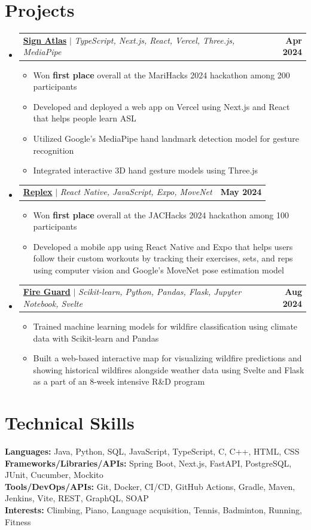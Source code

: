 \documentclass[letterpaper,11pt]{article}
\makeatletter
\newcommand{\resumeItem}[1]{
  \item\small{
    {#1 \vspace{-2pt}}
  }
}
\newcommand{\resumeProjectHeading}[4]{
  \item
  \begin{tabular*}{\textwidth}{l@{\extracolsep{\fill}}r}
    \small{\href{#3}{\textbf{#1}\hspace{0.3em}{\faLink}} $|$ \emph{#2}} & \textbf{\small #4} \\
  \end{tabular*}\vspace{-7pt}
}
\newcommand{\resumeSubHeadingListStart}{\begin{itemize}[leftmargin=0in, label={}]}
\newcommand{\resumeSubHeadingListEnd}{\end{itemize}}
\newcommand{\resumeItemListStart}{\begin{itemize}}
\newcommand{\resumeItemListEnd}{\end{itemize}\vspace{-5pt}}
\makeatother
\begin{document}
\section{Projects}
    \resumeSubHeadingListStart
      \resumeProjectHeading
          {Sign Atlas}
          {TypeScript, Next.js, React, Vercel, Three.js, MediaPipe}
          {https://devpost.com/software/sign-atlas}
          {Apr 2024}
          \resumeItemListStart
            \resumeItem{Won \textbf{first place} overall at the MariHacks 2024 hackathon among 200 participants}
            \resumeItem{Developed and deployed a web app on Vercel using Next.js and React that helps people learn ASL}
            \resumeItem{Utilized Google’s MediaPipe hand landmark detection model for gesture recognition}
            \resumeItem{Integrated interactive 3D hand gesture models using Three.js}
          \resumeItemListEnd
      \resumeProjectHeading
          {Replex}
          {React Native, JavaScript, Expo, MoveNet}
          {https://devpost.com/software/replex}
          {May 2024}
          \resumeItemListStart
            \resumeItem{Won \textbf{first place} overall at the JACHacks 2024 hackathon among 100 participants}
            \resumeItem{Developed a mobile app using React Native and Expo that helps users follow their custom workouts by tracking their exercises, sets, and reps using computer vision and Google’s MoveNet pose estimation model}
          \resumeItemListEnd
      \resumeProjectHeading
          {Fire Guard}
          {Scikit-learn, Python, Pandas, Flask, Jupyter Notebook, Svelte}
          {https://github.com/tran-ethan/fire-guard}
          {Aug 2024}
          \resumeItemListStart
            \resumeItem{Trained machine learning models for wildfire classification using climate data with Scikit-learn and Pandas}
            \resumeItem{Built a web-based interactive map for visualizing wildfire predictions and showing historical wildfires alongside weather data using Svelte and Flask as a part of an 8-week intensive R\&D program}
          \resumeItemListEnd
    \resumeSubHeadingListEnd

%
\section{Technical Skills}
 \begin{itemize}[leftmargin=0in, label={}]
    \small{\item{
     \textbf{Languages:}{ Java, Python, SQL, JavaScript, TypeScript, C, C++, HTML, CSS} \\
     \textbf{Frameworks/Libraries/APIs:}{ Spring Boot, Next.js, FastAPI, PostgreSQL, JUnit, Cucumber, Mockito} \\
     \textbf{Tools/DevOps/APIs:}{ Git, Docker, CI/CD, GitHub Actions, Gradle, Maven, Jenkins, Vite, REST, GraphQL, SOAP } \\
     \textbf{Interests:}{ Climbing, Piano, Language acquisition, Tennis, Badminton, Running, Fitness } \\
    }}
 \end{itemize}

\end{document}
